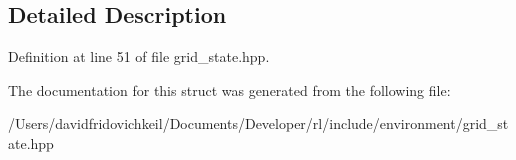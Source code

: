 \subsection{Detailed Description}


Definition at line 51 of file grid\+\_\+state.\+hpp.



The documentation for this struct was generated from the following file\+:\begin{DoxyCompactItemize}
\item 
/\+Users/davidfridovichkeil/\+Documents/\+Developer/rl/include/environment/grid\+\_\+state.\+hpp\end{DoxyCompactItemize}
